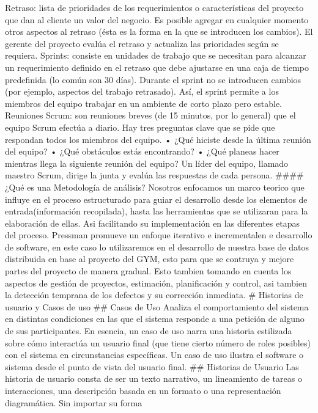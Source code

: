 \documentclass[spanish,12pt]{article}
\begin{document}
Retraso: lista de prioridades de los requerimientos o características
del proyecto que dan al cliente un valor del negocio. Es posible agregar
en cualquier momento otros aspectos al retraso (ésta es la forma en la
que se introducen los cambios). El gerente del proyecto evalúa el
retraso y actualiza las prioridades según se requiera. Sprints: consiste
en unidades de trabajo que se necesitan para alcanzar un requerimiento
definido en el retraso que debe ajustarse en una caja de tiempo
predefinida (lo común son 30 días). Durante el sprint no se introducen
cambios (por ejemplo, aspectos del trabajo retrasado). Así, el sprint
permite a los miembros del equipo trabajar en un ambiente de corto plazo
pero estable. Reuniones Scrum: son reuniones breves (de 15 minutos, por
lo general) que el equipo Scrum efectúa a diario. Hay tres preguntas
clave que se pide que respondan todos los miembros del equipo. • ¿Qué
hiciste desde la última reunión del equipo? • ¿Qué obstáculos estás
encontrando? • ¿Qué planeas hacer mientras llega la siguiente reunión
del equipo? Un líder del equipo, llamado maestro Scrum, dirige la junta
y evalúa las respuestas de cada persona. \#\#\#\# ¿Qué es una
Metodología de análisis? Nosotros enfocamos un marco teorico que influye
en el proceso estructurado para guiar el desarrollo desde los elementos
de entrada(información recopilada), hasta las herramientas que se
utilizaran para la elaboración de ellas. Asi facilitando su
implementación en las diferentes etapas del proceso. Pressman promueve
un enfoque iterativo e incrementalen e desarrollo de software, en este
caso lo utilizaremos en el desarrollo de nuestra base de datos
distribuida en base al proyecto del GYM, esto para que se contruya y
mejore partes del proyecto de manera gradual. Esto tambien tomando en
cuenta los aspectos de gestión de proyectos, estimación, planificación y
control, asi tambien la detección temprana de los defectos y su
corrección inmediata. \# Historias de usuario y Casos de uso \#\# Casos
de Uso Analiza el comportamiento del sistema en distintas condiciones en
las que el sistema responde a una petición de alguno de sus
participantes. En esencia, un caso de uso narra una historia estilizada
sobre cómo interactúa un usuario final (que tiene cierto número de roles
posibles) con el sistema en circunstancias específicas. Un caso de uso
ilustra el software o sistema desde el punto de vista del usuario final.
\#\# Historias de Usuario Las historia de usuario consta de ser un texto
narrativo, un lineamiento de tareas o interacciones, una descripción
basada en un formato o una representación diagramática. Sin importar su
forma
\end{document}
